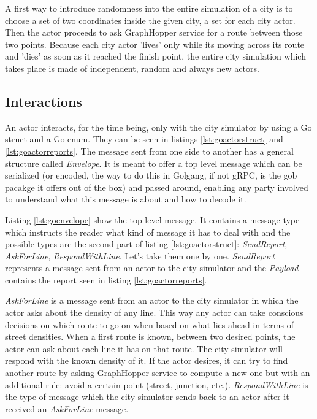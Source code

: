\documentclass[conference]{IEEEtran}
\begin{document}
A first way to introduce randomness into the entire simulation of a city is to choose a set of two coordinates inside the given city, a set for each city actor. Then the actor proceeds to ask GraphHopper service for a route between those two points. Because each city actor 'lives' only while its moving across its route and 'dies' as soon as it reached the finish point, the entire city simulation which takes place is made of independent, random and always new actors.

\subsection{Interactions}

An actor interacts, for the time being, only with the city simulator by using a Go struct and a Go enum. They can be seen in listings \ref{lst:goactorstruct} and \ref{lst:goactorreports}. The message sent from one side to another has a general structure called \textit{Envelope}. It is meant to offer a top level message which can be serialized (or encoded, the way to do this in Golgang, if not gRPC, is the gob pacakge it offers out of the box) and passed around, enabling any party involved to understand what this message is about and how to decode it.

Listing \ref{lst:goenvelope} show the top level message. It contains a message type which instructs the reader what kind of message it has to deal with and the possible types are the second part of listing \ref{lst:goactorstruct}: \textit{SendReport}, \textit{AskForLine}, \textit{RespondWithLine}. Let's take them one by one. \textit{SendReport} represents a message sent from an actor to the city simulator and the \textit{Payload} contains the report seen in listing \ref{lst:goactorreports}. 

\textit{AskForLine} is a message sent from an actor to the city simulator in which the actor asks about the density of any line. This way any actor can take conscious decisions on which route to go on when based on what lies ahead in terms of street densities. When a first route is known, between two desired points, the actor can ask about each line it has on that route. The city simulator will respond with the known density of it. If the actor desires, it can try to find another route by asking GraphHopper service to compute a new one but with an additional rule: avoid a certain point (street, junction, etc.). \textit{RespondWithLine} is the type of message which the city simulator sends back to an actor after it received an \textit{AskForLine} message.
\end{document}
